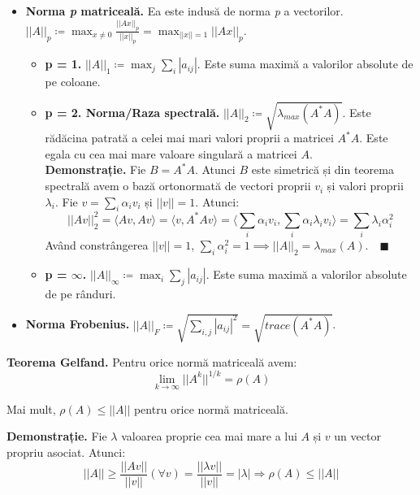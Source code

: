 \documentclass{exam}
\begin{document}
\begin{itemize}
	\item \textbf{Norma \textit{p} matriceală.} Ea este indusă de norma \textit{p} a vectorilor. \\
	      $||A||_p \coloneq \max_{x \neq 0} \frac{||Ax||_p}{||x||_p} = \max_{||x|| = 1} ||Ax||_p$.
	      \begin{itemize}
		      \item \textbf{p = 1.} $||A||_1 \coloneq \max_j \sum_i |a_{ij}|$. Este suma maximă a valorilor absolute
		            de pe coloane.
		      \item \textbf{p = 2. Norma/Raza spectrală.} $||A||_2 \coloneq \sqrt{\lambda_{max}(A^*A)}$.
		            Este rădăcina patrată a celei mai mari valori proprii a matricei $A^*A$.
		            Este egala cu cea mai mare valoare singulară a matricei $A$. \\
		            \textbf{Demonstrație.} Fie $B = A^*A$. Atunci $B$ este
		            simetrică și din teorema spectrală avem o bază ortonormată
		            de vectori proprii $v_i$ și valori proprii $\lambda_i$.
		            Fie $v = \sum_i \alpha_i v_i$ și $||v|| = 1$. Atunci:
		            \begin{equation*}
			            ||Av||^2_2 = \langle Av, Av \rangle = \langle v, A^*Av \rangle = \langle  \sum_{i} \alpha_i v_i, \sum_{i} \alpha_i \lambda_i v_i \rangle = \sum_{i} \lambda_i \alpha_i^2
		            \end{equation*}
		            Având constrângerea $||v|| = 1$, $\sum_{i} \alpha_i^2 = 1 \implies ||A||_2 = \lambda_{max}(A). \quad \blacksquare$

		      \item \textbf{p = $\infty$.} $||A||_{\infty} \coloneq \max_i \sum_j |a_{ij}|$. Este suma maximă a valorilor
		            absolute de pe rânduri.
	      \end{itemize}
	\item \textbf{Norma Frobenius.} $||A||_F \coloneq \sqrt{\sum_{i,j} |a_{ij}|^2} = \sqrt{trace(A^*A)}$.
\end{itemize}

\textbf{Teorema Gelfand.} Pentru orice normă matriceală avem:
\begin{equation*}
	\lim_{k \to \infty} ||A^k||^{1/k} = \rho(A)
\end{equation*}

Mai mult, $\rho(A) \leq ||A||$ pentru orice normă matriceală.

\textbf{Demonstrație.} Fie $\lambda$ valoarea proprie cea mai mare a lui $A$ și $v$ un vector propriu asociat. Atunci:
\begin{equation*}
	||A|| \geq \frac{||Av||}{||v||} (\forall v) = \frac{||\lambda v||}{||v||} = |\lambda| \Rightarrow \rho(A) \leq ||A||
\end{equation*}
\end{document}
